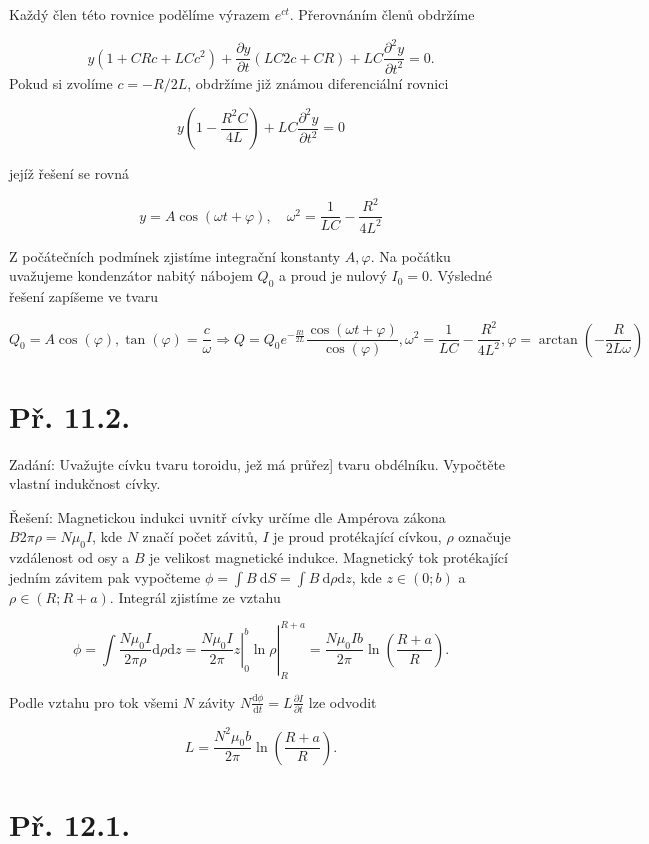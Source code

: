 \documentclass[czech,11pt,a4paper]{article}
\begin{document}
Každý člen této rovnice podělíme výrazem $e^{c t}$. Přerovnáním členů obdržíme

$$
y\left(1+C R c+L C c^{2}\right)+\frac{\partial y}{\partial t}(L C 2 c+C R)+L C \frac{\partial^{2} y}{\partial t^{2}}=0 .
$$
Pokud si zvolíme $c=-R / 2 L$, obdržíme již známou diferenciální rovnici

$$
y\left(1-\frac{R^{2} C}{4 L}\right)+L C \frac{\partial^{2} y}{\partial t^{2}}=0
$$

jejíž řešení se rovná

$$
y=A \cos (\omega t+\varphi), \quad \omega^{2}=\frac{1}{L C}-\frac{R^{2}}{4 L^{2}}
$$

Z počátečních podmínek zjistíme integrační konstanty $A, \varphi$. Na počátku uvažujeme kondenzátor nabitý nábojem $Q_{0}$ a proud je nulový $I_{0}=0$. Výsledné řešení zapíšeme ve tvaru

$$
Q_{0}=A \cos (\varphi), \tan (\varphi)=\frac{c}{\omega} \Rightarrow Q=Q_{0} e^{-\frac{R t}{2 L}} \frac{\cos (\omega t+\varphi)}{\cos (\varphi)}, \omega^{2}=\frac{1}{L C}-\frac{R^{2}}{4 L^{2}}, \varphi=\arctan \left(-\frac{R}{2 L \omega}\right)
$$
\section{Př. 11.2.}

Zadání: Uvažujte cívku tvaru toroidu, jež má průřez] tvaru obdélníku. Vypočtěte vlastní indukčnost cívky.

Řešení: Magnetickou indukci uvnitř cívky určíme dle Ampérova zákona $B 2 \pi \rho=N \mu_{0} I$, kde $N$ značí počet závitů, $I$ je proud protékající cívkou, $\rho$ označuje vzdálenost od osy a $B$ je velikost magnetické indukce. Magnetický tok protékající jedním závitem pak vypočteme $\phi=\int B \mathrm{~d} S=\int B \mathrm{~d} \rho \mathrm{d} z$, kde $z \in(0 ; b)$ a $\rho \in(R ; R+a)$. Integrál zjistíme ze vztahu

$$
\phi=\int \frac{N \mu_{0} I}{2 \pi \rho} \mathrm{d} \rho \mathrm{d} z=\left.\left.\frac{N \mu_{0} I}{2 \pi} z\right|_{0} ^{b} \ln \rho\right|_{R} ^{R+a}=\frac{N \mu_{0} I b}{2 \pi} \ln \left(\frac{R+a}{R}\right) .
$$

Podle vztahu pro tok všemi $N$ závity $N \frac{\mathrm{d} \phi}{\mathrm{d} t}=L \frac{\partial I}{\partial t}$ lze odvodit

$$
L=\frac{N^{2} \mu_{0} b}{2 \pi} \ln \left(\frac{R+a}{R}\right) .
$$


\section{Př. 12.1.}
\end{document}
